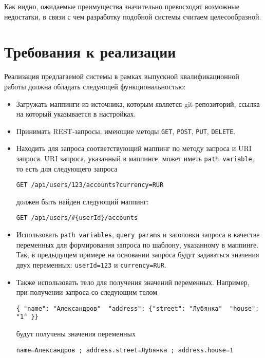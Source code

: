 Как видно, ожидаемые преимущества значительно превосходят возможные недостатки, в связи с чем разработку подобной системы считаем целесообразной.

\section{Требования к реализации} \label{sec:requirements} %

Реализация предлагаемой системы в рамках выпускной квалификационной работы должна обладать следующей функциональностью:

\begin{itemize}
    \item Загружать маппинги из источника, которым является git-репозиторий, ссылка на который указывается в настройках.

    \item Принимать REST-запросы, имеющие методы \texttt{GET}, \texttt{POST}, \texttt{PUT}, \texttt{DELETE}.

    \item Находить для запроса соответствующий маппинг по методу запроса и URI запроса.
    URI запроса, указанный в маппинге, может иметь \texttt{path variable}, то есть для следующего запроса

    \texttt{GET /api/users/123/accounts?currency=RUR}

    должен быть найден следующий маппинг:

    \texttt{GET /api/users/\#\{userId\}/accounts}

    \item Использовать \texttt{path variables}, \texttt{query params} и заголовки запроса в качестве переменных для формирования запроса по шаблону, указанному в маппинге.
    Так, в предыдущем примере на основании запроса будут задаваться значения двух переменных: \texttt{userId=123} и \texttt{currency=RUR}.

    \item Также использовать тело для получения значений переменных.
    Например, при получении запроса со следующим телом

    \texttt{\{ "name": "Александров"\, "address": \{"street": "Лубянка"\, "house": "1" \}\}}

    будут получены значения переменных

    \texttt{name=Александров ; address.street=Лубянка ; address.house=1}


\end{itemize}
